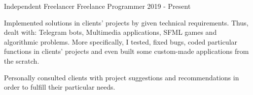 

\begin{cventries}

  \cventry
    {\large Independent Freelancer} %
    {\Large Freelance Programmer} %
    { } %
    {\large 2019 - Present} %
    {
      \begin{cvitems} %
        \item {\large Implemented solutions in clients' projects by given technical requirements. Thus, dealt with: Telegram bots, Multimedia applications, SFML games and algorithmic problems. More specifically, I tested, fixed bugs, coded particular functions in clients' projects and even built some custom-made applications from the scratch.}
        \item {\large Personally consulted clients with project suggestions and recommendations in order to fulfill their particular needs.}
      \end{cvitems}
    }

\end{cventries}
